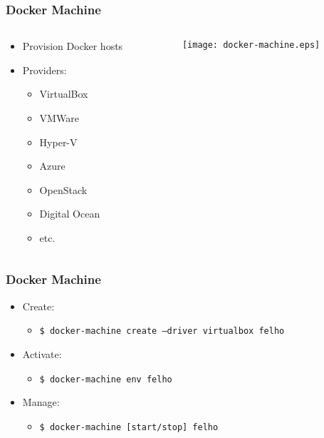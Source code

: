 \documentclass[xetex,mathserif,serif]{beamer}
\begin{document}
  \begin{frame}
    \frametitle{Docker Machine}
    \begin{columns}
      \begin{column}{0.3\textwidth}
        \begin{itemize}
          \item Provision Docker hosts
          \item Providers:
            \begin{itemize}
              \item VirtualBox
              \item VMWare
              \item Hyper-V
              \item Azure
              \item OpenStack
              \item Digital Ocean
              \item etc.
            \end{itemize}
        \end{itemize}
      \end{column}
      \begin{column}{0.7\textwidth}
        \texttt{[image: docker-machine.eps]}
      \end{column}
    \end{columns}
  \end{frame}
  \begin{frame}
    \frametitle{Docker Machine}
    \begin{itemize}
      \item Create:
        \begin{itemize}
          \item \texttt{\$ docker-machine create --driver virtualbox felho}
        \end{itemize}
      \item Activate:
        \begin{itemize}
          \item \texttt{\$ docker-machine env felho}
        \end{itemize}
      \item Manage:
        \begin{itemize}
          \item \texttt{\$ docker-machine [start/stop] felho}
        \end{itemize}
    \end{itemize}
  \end{frame}
\end{document}
